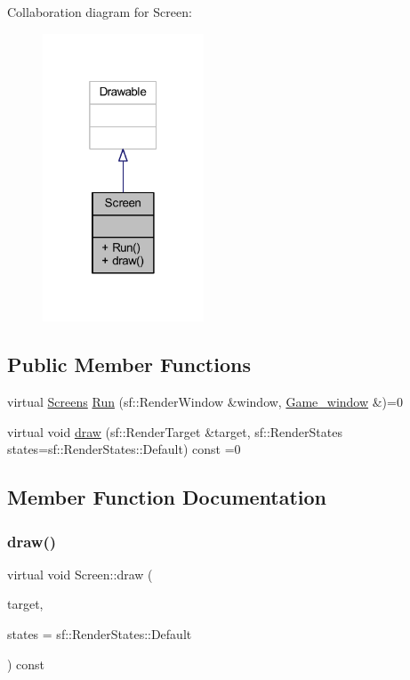 Collaboration diagram for Screen\+:\nopagebreak
\begin{figure}[H]
\begin{center}
\leavevmode
\includegraphics[width=136pt]{class_screen__coll__graph}
\end{center}
\end{figure}
\subsection*{Public Member Functions}
\begin{DoxyCompactItemize}
\item 
virtual \hyperlink{_globals_8h_a3d5776bab98402b03be09156bacf4f68}{Screens} \hyperlink{class_screen_aadaffbe93949a54f04e2a87c5602f610}{Run} (sf\+::\+Render\+Window \&window, \hyperlink{class_game__window}{Game\+\_\+window} \&)=0
\item 
virtual void \hyperlink{class_screen_abcb5544dfe717c7da181520803f43e25}{draw} (sf\+::\+Render\+Target \&target, sf\+::\+Render\+States states=sf\+::\+Render\+States\+::\+Default) const =0
\end{DoxyCompactItemize}


\subsection{Member Function Documentation}
\mbox{\label{class_screen_abcb5544dfe717c7da181520803f43e25}} 
\subsubsection{\texorpdfstring{draw()}{draw()}}
{\footnotesize\ttfamily virtual void Screen\+::draw (\begin{DoxyParamCaption}\item[{sf\+::\+Render\+Target \&}]{target,  }\item[{sf\+::\+Render\+States}]{states = {\ttfamily sf\+:\+:RenderStates\+:\+:Default} }\end{DoxyParamCaption}) const\hspace{0.3cm}{\ttfamily [pure virtual]}}



